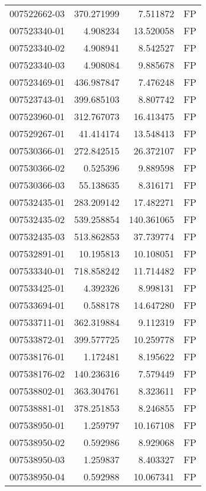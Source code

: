 \begin{tabular}{lrrl}
007522662-03 &  370.271999 &       7.511872 &   FP \\
007523340-01 &    4.908234 &      13.520058 &   FP \\
007523340-02 &    4.908941 &       8.542527 &   FP \\
007523340-03 &    4.908084 &       9.885678 &   FP \\
007523469-01 &  436.987847 &       7.476248 &   FP \\
007523743-01 &  399.685103 &       8.807742 &   FP \\
007523960-01 &  312.767073 &      16.413475 &   FP \\
007529267-01 &   41.414174 &      13.548413 &   FP \\
007530366-01 &  272.842515 &      26.372107 &   FP \\
007530366-02 &    0.525396 &       9.889598 &   FP \\
007530366-03 &   55.138635 &       8.316171 &   FP \\
007532435-01 &  283.209142 &      17.482271 &   FP \\
007532435-02 &  539.258854 &     140.361065 &   FP \\
007532435-03 &  513.862853 &      37.739774 &   FP \\
007532891-01 &   10.195813 &      10.108051 &   FP \\
007533340-01 &  718.858242 &      11.714482 &   FP \\
007533425-01 &    4.392326 &       8.998131 &   FP \\
007533694-01 &    0.588178 &      14.647280 &   FP \\
007533711-01 &  362.319884 &       9.112319 &   FP \\
007533872-01 &  399.577725 &      10.259778 &   FP \\
007538176-01 &    1.172481 &       8.195622 &   FP \\
007538176-02 &  140.236316 &       7.579449 &   FP \\
007538802-01 &  363.304761 &       8.323611 &   FP \\
007538881-01 &  378.251853 &       8.246855 &   FP \\
007538950-01 &    1.259797 &      10.167108 &   FP \\
007538950-02 &    0.592986 &       8.929068 &   FP \\
007538950-03 &    1.259837 &       8.403327 &   FP \\
007538950-04 &    0.592988 &      10.067341 &   FP \\

\end{tabular}
